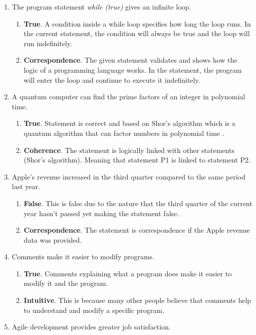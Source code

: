 \documentclass{article}
\begin{document}
\begin{enumerate}
	\item The program statement \textit{while (true) } gives an infinite loop.
 \begin{enumerate}
     \item \textbf{True}. A condition inside a while loop specifies how long the loop runs. In the current statement, the condition will always be true and the loop will run indefinitely.
     \item \textbf{Correspondence}. The given statement validates and shows how the logic of a programming language works. In the statement, the program will enter the loop and continue to execute it indefinitely.
 \end{enumerate}
	\item A quantum computer can find the prime factors of an integer in polynomial time.
 \begin{enumerate}
     \item \textbf{True}. Statement is correct and based on Shor's algorithm which is a quantum algorithm that can factor numbers in polynomial time \cite{factorization_2023}.
     \item \textbf{Coherence}. The statement is logically linked with other  statements (Shor's algorithm). Meaning that statement P1 is linked to statement P2.
 \end{enumerate}
	\item Apple's revenue increased in the third quarter compared to the same period last year.
 \begin{enumerate}
     \item \textbf{False}. This is false due to the nature that the third quarter of the current year hasn't passed yet making the statement false. 
     \item \textbf{Correspondence}. The statement is correspondence if the Apple revenue data was provided.
 \end{enumerate}
	\item Comments make it easier to modify programs.
 \begin{enumerate}
     \item \textbf{True}. Comments explaining what a program does make it easier to modify it and the program.
     \item \textbf{Intuitive}. This is because many other people believe that comments help to understand and modify a specific program.
 \end{enumerate}
	\item Agile development provides greater job satisfaction.

\end{enumerate}
\end{document}
